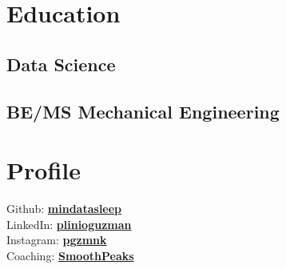 \documentclass[letterpaper]{deedy-resume} %
\begin{document}

\lastupdated %



\begin{minipage}[t]{0.33\textwidth} %


\section{Education} 

\subsection{Data Science}
\descript{}

\sectionspace %

\subsection{BE/MS Mechanical Engineering}

\sectionspace %


\section{Profile} 

Github: \href{https://github.com/mindatasleep}{\bf mindatasleep} \\
LinkedIn: \href{https://www.linkedin.com/in/plinioguzman/}{\bf plinioguzman} \\
Instagram: \href{https://instagram.com/pgzmnk/}{\bf pgzmnk} \\
Coaching: \href{https://smoothpeaks.com}{\bf SmoothPeaks} \\



\end{minipage}
\end{document}
